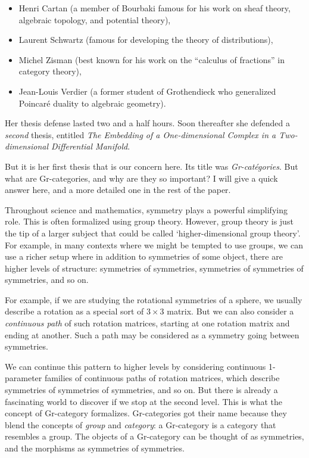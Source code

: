 \documentclass[reqno,12pt]{amsart}
\theoremstyle{definition}
\begin{document}
\begin{itemize}
\item Henri Cartan (a member of Bourbaki famous for his work on sheaf theory, algebraic topology, and potential theory), 
\item Laurent Schwartz (famous for developing the theory of distributions), 
\item Michel Zisman (best known for his work on the ``calculus of fractions'' in category theory), 
\item  Jean-Louis Verdier (a former student of Grothendieck who generalized Poincar\'e duality to algebraic geometry).
\end{itemize}
Her thesis defense lasted two and a half hours.   Soon thereafter she defended a \textsl{second} thesis, entitled \textsl{The Embedding of a One-dimensional Complex in a Two-dimensional Differential Manifold}.  

But it is her first thesis that is our concern here.   Its title was \emph{Gr-cat\'egories}.   But what are Gr-categories, and why are they so important?   I will give a quick answer here, and a more detailed one in the rest of the paper.

Throughout science and mathematics, symmetry plays a powerful simplifying
role.   This is often formalized using group theory.  However, group theory is just the tip of a larger subject that could be called `higher-dimensional group theory'. For example, in many contexts where we might be tempted to use groups, we can use a richer setup where in addition to symmetries of some object, there are higher levels of structure: symmetries of symmetries, symmetries of symmetries of  symmetries, and so on.

For example, if we are studying the rotational symmetries of a sphere, we usually describe a rotation as a special sort of $3 \times 3$ matrix.  But we can also consider a \emph{continuous path} of such rotation matrices, starting at one rotation matrix and ending at another.   Such a path may be considered as a symmetry going between symmetries.

We can continue this pattern to higher levels by considering continuous 1-parameter families of continuous paths of rotation matrices, which describe symmetries of symmetries of symmetries, and so on.    But there is already a fascinating world to discover if we stop at the second level.  This is what the concept of Gr-category formalizes.    Gr-categories got their name because they blend the concepts of \emph{group} and \emph{category}: a Gr-category is a category that resembles a group.  The objects of a Gr-category can be thought of as symmetries, and the morphisms as
symmetries of symmetries.
\end{document}
